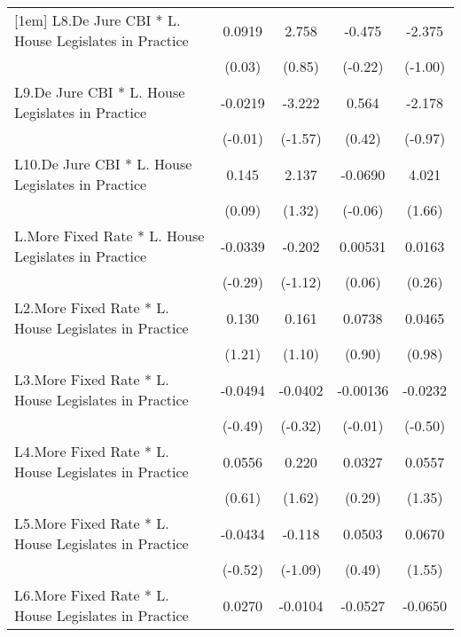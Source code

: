 {\begin{longtable}{l*{4}{c}}
[1em]
L8.De Jure CBI * L. House Legislates in Practice&   0.0919         &    2.758         &   -0.475         &   -2.375         \\
                &   (0.03)         &   (0.85)         &  (-0.22)         &  (-1.00)         \\
[1em]
L9.De Jure CBI * L. House Legislates in Practice&  -0.0219         &   -3.222         &    0.564         &   -2.178         \\
                &  (-0.01)         &  (-1.57)         &   (0.42)         &  (-0.97)         \\
[1em]
L10.De Jure CBI * L. House Legislates in Practice&    0.145         &    2.137         &  -0.0690         &    4.021         \\
                &   (0.09)         &   (1.32)         &  (-0.06)         &   (1.66)         \\
[1em]
L.More Fixed Rate * L. House Legislates in Practice&  -0.0339         &   -0.202         &  0.00531         &   0.0163         \\
                &  (-0.29)         &  (-1.12)         &   (0.06)         &   (0.26)         \\
[1em]
L2.More Fixed Rate * L. House Legislates in Practice&    0.130         &    0.161         &   0.0738         &   0.0465         \\
                &   (1.21)         &   (1.10)         &   (0.90)         &   (0.98)         \\
[1em]
L3.More Fixed Rate * L. House Legislates in Practice&  -0.0494         &  -0.0402         & -0.00136         &  -0.0232         \\
                &  (-0.49)         &  (-0.32)         &  (-0.01)         &  (-0.50)         \\
[1em]
L4.More Fixed Rate * L. House Legislates in Practice&   0.0556         &    0.220         &   0.0327         &   0.0557         \\
                &   (0.61)         &   (1.62)         &   (0.29)         &   (1.35)         \\
[1em]
L5.More Fixed Rate * L. House Legislates in Practice&  -0.0434         &   -0.118         &   0.0503         &   0.0670         \\
                &  (-0.52)         &  (-1.09)         &   (0.49)         &   (1.55)         \\
[1em]
L6.More Fixed Rate * L. House Legislates in Practice&   0.0270         &  -0.0104         &  -0.0527         &  -0.0650         \\

\end{longtable}}
